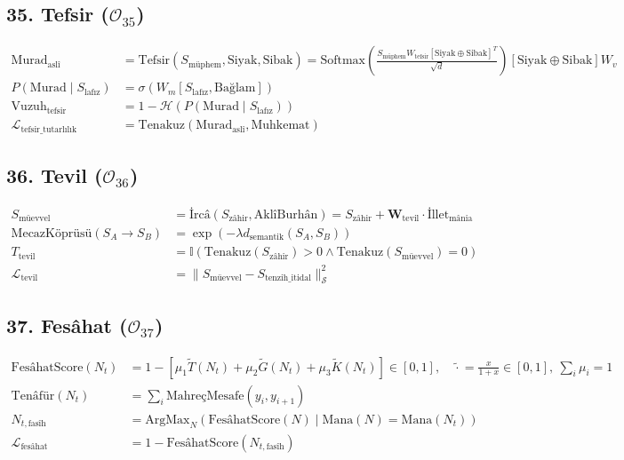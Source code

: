 \documentclass[11pt, a4paper]{article}
\begin{document}
\subsection{35. Tefsir ($\mathcal{O}_{35}$)}
\begin{align}
\text{Murad}_{\text{aslî}} &= \text{Tefsir}(S_{\text{müphem}}, \text{Siyak}, \text{Sibak}) = \text{Softmax}\left( \frac{S_{\text{müphem}} W_{\text{tefsir}} [\text{Siyak} \oplus \text{Sibak}]^T}{\sqrt{d}} \right) [\text{Siyak} \oplus \text{Sibak}] W_v \\
P(\text{Murad} \mid S_{\text{lafız}}) &= \sigma( W_m [S_{\text{lafız}}, \text{Bağlam}] ) \\
\text{Vuzuh}_{\text{tefsir}} &= 1 - \mathcal{H}(P(\text{Murad} \mid S_{\text{lafız}})) \\
\mathcal{L}_{\text{tefsir\_tutarlılık}} &= \text{Tenakuz}(\text{Murad}_{\text{aslî}}, \text{Muhkemat})
\end{align}

\subsection{36. Tevil ($\mathcal{O}_{36}$)}
\begin{align}
S_{\text{müevvel}} &= \text{İrcâ}(S_{\text{zâhir}}, \text{AklîBurhân}) = S_{\text{zâhir}} + \mathbf{W}_{\text{tevil}} \cdot \text{İllet}_{\text{mânia}} \\
\text{MecazKöprüsü}(S_A \to S_B) &= \exp\left( -\lambda d_{\text{semantik}}(S_A, S_B) \right) \\
T_{\text{tevil}} &= \mathbb{I}\left( \text{Tenakuz}(S_{\text{zâhir}}) > 0 \land \text{Tenakuz}(S_{\text{müevvel}}) = 0 \right) \\
\mathcal{L}_{\text{tevil}} &= \| S_{\text{müevvel}} - S_{\text{tenzih\_itidal}} \|_{\mathcal{S}}^2
\end{align}

\subsection{37. Fesâhat ($\mathcal{O}_{37}$)}
\begin{align}
\text{FesâhatScore}(N_t) &= 1 - \left[ \mu_1 \tilde{T}(N_t) + \mu_2 \tilde{G}(N_t) + \mu_3 \tilde{K}(N_t) \right] \in [0,1], \quad \tilde{\cdot} = \tfrac{x}{1+x} \in [0,1], \ \textstyle\sum_i \mu_i = 1 \\
\text{Tenâfür}(N_t) &= \sum_{i} \text{MahreçMesafe}(y_i, y_{i+1}) \\
N_{t, \text{fasîh}} &= \text{ArgMax}_{N} \left( \text{FesâhatScore}(N) \mid \text{Mana}(N) = \text{Mana}(N_t) \right) \\
\mathcal{L}_{\text{fesâhat}} &= 1 - \text{FesâhatScore}(N_{t, \text{fasîh}})
\end{align}
\end{document}
